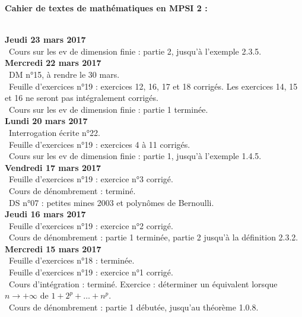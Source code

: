 \documentclass[12pt,a4paper]{article}
\begin{document}
\begin{center}
\Large\bf Cahier de textes de mathématiques en MPSI 2 :
\end{center}
\vspace{1cm}
\vspace{.4cm}\\

\noindent\textbf{Jeudi 23 mars 2017}\\
\bu\ Cours sur les ev de dimension finie : partie 2, jusqu'à l'exemple 2.3.5.\vspace{.4cm}\\

\noindent\textbf{Mercredi 22 mars 2017}\\
\bu\ DM n°15, à rendre le 30 mars.\\
\bu\ Feuille d'exercices n°19 : exercices 12, 16, 17 et 18 corrigés. Les exercices 14, 15 et 16 ne seront pas intégralement corrigés. \\
\bu\ Cours sur les ev de dimension finie : partie 1 terminée.\vspace{.4cm}\\

\noindent\textbf{Lundi 20 mars 2017}\\
\bu\ Interrogation écrite n°22.\\
\bu\ Feuille d'exercices n°19 : exercices 4 à 11 corrigés.\\
\bu\ Cours sur les ev de dimension finie : partie 1, jusqu'à l'exemple 1.4.5.\vspace{.4cm}\\

\noindent\textbf{Vendredi 17  mars 2017}\\
\bu\ Feuille d'exercices n°19 : exercice n°3 corrigé.\\
\bu\ Cours de dénombrement : terminé.\\
\bu\ DS n°07 : petites mines 2003 et polynômes de Bernoulli.\vspace{.4cm}\\

\noindent\textbf{Jeudi 16  mars 2017}\\
\bu\ Feuille d'exercices n°19 : exercice n°2 corrigé.\\
\bu\ Cours de dénombrement : partie 1 terminée, partie 2 jusqu'à la définition 2.3.2.\vspace{.4cm}\\

\noindent\textbf{Mercredi 15  mars 2017}\\
\bu\ Feuille d'exercices n°18 : terminée.\\
\bu\ Feuille d'exercices n°19 : exercice n°1 corrigé.\\
\bu\ Cours d'intégration : terminé. Exercice : déterminer un équivalent lorsque $n \to +\infty$ de $1+2^p+\dots+n^p$.\\
\bu\ Cours de dénombrement : partie 1 débutée, jusqu'au théorème 1.0.8.\vspace{.4cm}\\
\end{document}
